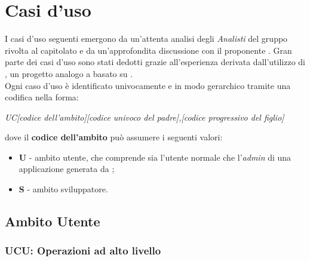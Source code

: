 \section{Casi d'uso}
I casi d'uso seguenti emergono da un'attenta analisi degli \textit{Analisti} del gruppo \GroupName{} rivolta al capitolato e da un'approfondita discussione con il proponente \Proponente{}. Gran parte dei casi d'uso sono stati dedotti grazie all'esperienza derivata dall'utilizzo di , un progetto analogo a \ProjectName{} basato su .\\
Ogni caso d'uso è identificato univocamente e in modo gerarchico tramite una codifica nella forma:
\begin{center}
	\textit{UC[codice dell'ambito][codice univoco del padre],[codice progressivo del figlio]}
\end{center} 
dove il \textbf{codice dell'ambito} può assumere i seguenti valori:

\begin{itemize}
	\item \textbf{U} - ambito utente, che comprende sia l'utente normale che l'\textit{admin} di una applicazione generata da \ProjectName{};
	\item \textbf{S} - ambito sviluppatore.
\end{itemize}


\subsection{Ambito Utente}
	\subsubsection{UCU: Operazioni ad alto livello}
		

